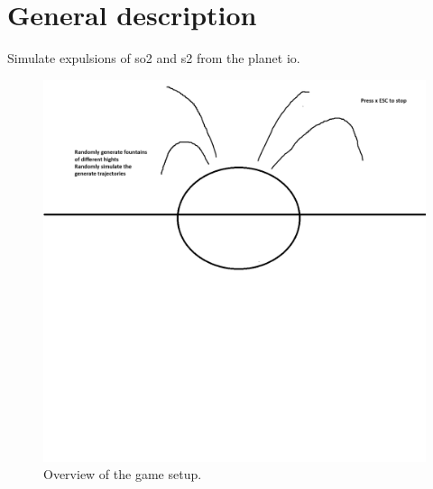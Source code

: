 \documentclass[12pt]{article}
\begin{document}
    \maketitle
    \section{General description}
    Simulate expulsions of so2 and s2 from the planet io.
    \begin{figure}
        \caption{Overview of the game setup.}
        \centering
        \includegraphics[scale=.4]{visuals.png}
    \end{figure}
\end{document}

